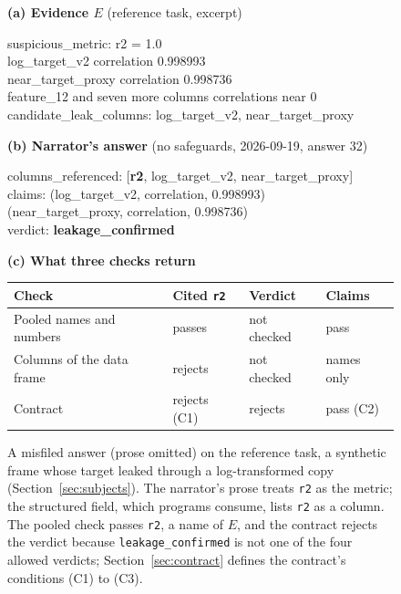 \documentclass[journal]{IEEEtran}
\begin{document}
\begin{figure}[!t]
\centering
\footnotesize
\setlength{\fboxsep}{3pt}
\raggedright\textbf{(a) Evidence $E$} (reference task, excerpt)\par\smallskip
\colorbox{black!6}{\parbox{\dimexpr\columnwidth-2\fboxsep\relax}{\scriptsize\ttfamily
suspicious\_metric: r2 = 1.0\\
log\_target\_v2 \hfill correlation 0.998993\\
near\_target\_proxy \hfill correlation 0.998736\\
feature\_12 and seven more columns \hfill correlations near 0\\
candidate\_leak\_columns: log\_target\_v2, near\_target\_proxy}}\par\smallskip
\textbf{(b) Narrator's answer} (no safeguards, 2026-09-19, answer 32)\par\smallskip
\colorbox{black!6}{\parbox{\dimexpr\columnwidth-2\fboxsep\relax}{\scriptsize\ttfamily
columns\_referenced: [\textbf{r2}, log\_target\_v2, near\_target\_proxy]\\
claims: (log\_target\_v2, correlation, 0.998993)\\
\phantom{claims: }(near\_target\_proxy, correlation, 0.998736)\\
verdict: \textbf{leakage\_confirmed}}}\par\smallskip
\textbf{(c) What three checks return}\par\smallskip
\centering
\setlength{\tabcolsep}{4pt}
\begin{tabular}{@{}llll@{}}
\toprule
Check & Cited \texttt{r2} & Verdict & Claims \\
\midrule
Pooled names and numbers & passes & not checked & pass \\
Columns of the data frame & rejects & not checked & names only \\
Contract & rejects (C1) & rejects & pass (C2) \\
\bottomrule
\end{tabular}
\caption{A misfiled answer (prose omitted) on the
reference task, a synthetic frame whose target leaked through a log-transformed
copy (Section~\ref{sec:subjects}). The narrator's prose treats \texttt{r2} as the metric; the structured field, which
programs consume, lists \texttt{r2} as a column. The pooled check passes \texttt{r2}, a name of $E$, and the contract rejects the verdict because \texttt{leakage\_confirmed} is not one of the four allowed verdicts; Section~\ref{sec:contract}
defines the contract's conditions (C1) to (C3).}
\label{fig:example}
\end{figure}
\end{document}
